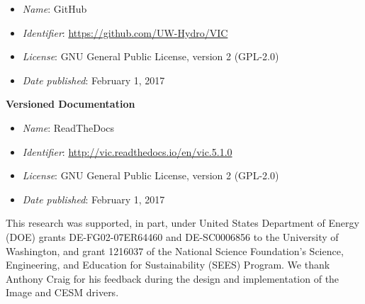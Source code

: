 \documentclass[gmd, manuscript]{copernicus}
\begin{document}
\begin{itemize}
	\item \textit{Name}: GitHub
	\item \textit{Identifier}: \url{https://github.com/UW-Hydro/VIC}
	\item \textit{License}: GNU General Public License, version 2 (GPL-2.0)
	\item \textit{Date published}: February 1, 2017
\end{itemize}

{\bf Versioned Documentation}

\begin{itemize}
	\item \textit{Name}: ReadTheDocs
	\item \textit{Identifier}: \url{http://vic.readthedocs.io/en/vic.5.1.0}
	\item \textit{License}: GNU General Public License, version 2 (GPL-2.0)
	\item \textit{Date published}: February 1, 2017
\end{itemize}



\begin{acknowledgements}
  This research was supported, in part, under United States Department of Energy (DOE) grants DE-FG02-07ER64460 and DE-SC0006856 to the University of Washington, and grant 1216037 of the National Science Foundation's Science, Engineering, and Education for Sustainability (SEES) Program. We thank Anthony Craig for his feedback during the design and implementation of the Image and CESM drivers.
\end{acknowledgements}




%
%
%
\end{document}
